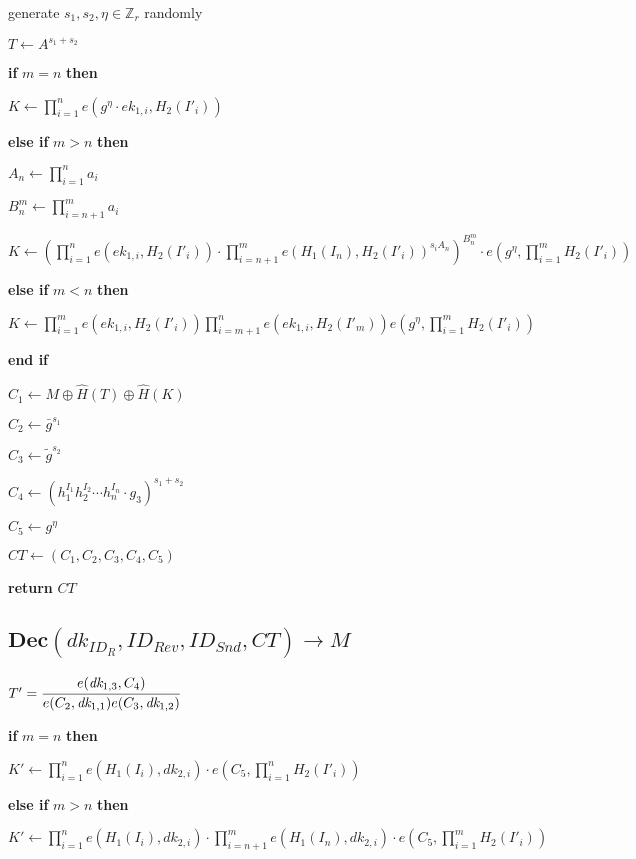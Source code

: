 \documentclass[a4paper]{article}
\begin{document}
generate $s_1, s_2, \eta \in \mathbb{Z}_r$ randomly

$T \gets A^{s_1 + s_2}$

\textbf{if} $m = n$ \textbf{then}

\quad$K \gets \prod_{i = 1}^n e(g^{\eta} \cdot \textit{ek}_{1, i}, H_2(I'_i))$

\textbf{else if} $m > n$ \textbf{then}

\quad$A_n \gets \prod\limits_{i = 1}^n a_i$

\quad$B_n^m \gets \prod\limits_{i = n + 1}^m a_i$

\quad$K \gets
(
\prod\limits_{i = 1}^n e(\textit{ek}_{1, i}, H_2(I'_i))
\cdot \prod\limits_{i = n + 1}^m e(H_1(I_n), H_2(I'_i))^{s_i A_n}
)^{B_n^m}
\cdot e(g^{\eta}, \prod\limits_{i = 1}^m H_2(I'_i))
$

\textbf{else if} $m < n$ \textbf{then}

\quad$K \gets
\prod\limits_{i = 1}^m e(\textit{ek}_{1, i}, H_2(I'_i))
\prod\limits_{i = m + 1}^n e(\textit{ek}_{1, i}, H_2(I'_m))
e(g^{\eta}, \prod\limits_{i = 1}^m H_2(I'_i))
$

\textbf{end if}

$C_1 \gets M \oplus \hat{H}(T) \oplus \hat{H}(K)$

$C_2 \gets \bar{g}^{s_1}$

$C_3 \gets \tilde{g}^{s_2}$

$C_4 \gets (h_1^{I_1} h_2^{I_2} \cdots h_n^{I_n} \cdot g_3)^{s_1 + s_2}$

$C_5 \gets g^{\eta}$

$\textit{CT} \gets (C_1, C_2, C_3, C_4, C_5)$

\textbf{return} $\textit{CT}$

\subsection{$\textbf{Dec}(\textit{dk}_{\textit{ID}_R}, \textit{ID}_\textit{Rev}, \textit{ID}_\textit{Snd}, \textit{CT}) \rightarrow M$}

$T' = \cfrac{e(\textit{dk}_{1, 3}, C_4)}{e(C_2, \textit{dk}_{1, 1})e(C_3, \textit{dk}_{1, 2})}$

\textbf{if} $m = n$ \textbf{then}

\quad$K' \gets
\prod\limits_{i = 1}^n e(H_1(I_i), \textit{dk}_{2, i}) 
\cdot e(C_5, \prod\limits_{i = 1}^n H_2(I'_i))
$

\textbf{else if} $m > n$ \textbf{then}

\quad$K' \gets
\prod\limits_{i = 1}^n e(H_1(I_i), \textit{dk}_{2, i})
\cdot \prod\limits_{i = n + 1}^m e(H_1(I_n), \textit{dk}_{2, i})
\cdot e(C_5, \prod\limits_{i = 1}^m H_2(I'_i))
$
\end{document}

